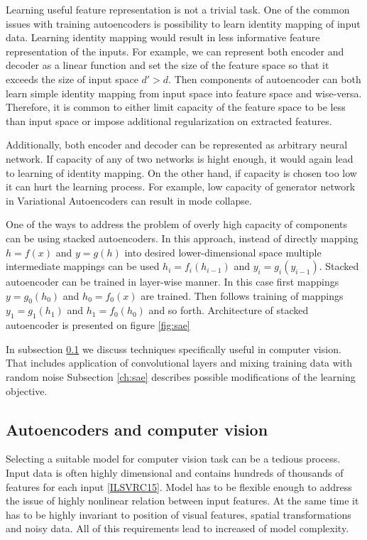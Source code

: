 Learning useful feature representation is not a trivial task.
One of the common issues with training autoencoders is possibility to learn identity mapping of input data.
Learning identity mapping would result in less informative feature representation of the inputs.
For example, we can represent both encoder and decoder as a linear function and set the size of the feature space so that it exceeds the size of input space $d' > d$.
Then components of autoencoder can both learn simple identity mapping from input space into feature space and wise-versa.
Therefore, it is common to either limit capacity of the feature space to be less than input space or impose additional regularization on extracted features.

Additionally, both encoder and decoder can be represented as arbitrary neural network.
If capacity of any of two networks is hight enough, it would again lead to learning of identity mapping.
On the other hand, if capacity is chosen too low it can hurt the learning process.
For example, low capacity of generator network in Variational Autoencoders can result in mode collapse.

One of the ways to address the problem of overly high capacity of components can be using stacked autoencoders.
In this approach, instead of directly mapping $h=f(x)$ and $y=g(h)$ into desired lower-dimensional space multiple intermediate mappings can be used $h_i=f_i(h_{i-1})$ and $y_i=g_i(y_{i-1})$.
Stacked autoencoder can be trained in layer-wise manner.
In this case first mappings $y=g_0(h_0)$ and $h_0=f_0(x)$ are trained.
Then follows training of mappings $y_1=g_1(h_1)$ and $h_1=f_0(h_0)$ and so forth.
Architecture of stacked autoencoder is presented on figure \ref{fig:sae}



In subsection \ref{ch:dcae} we discuss techniques specifically useful in computer vision.
That includes application of convolutional layers and mixing training data with random noise
Subsection \ref{ch:sae} describes possible modifications of the learning objective.


\subsection{Autoencoders and computer vision}\label{ch:dcae}

Selecting a suitable model for computer vision task can be a tedious process.
Input data is often highly dimensional and contains hundreds of thousands of features for each input \ref{ILSVRC15}.
Model has to be flexible enough to address the issue of highly nonlinear relation between input features.
At the same time it has to be highly invariant to position of visual features, spatial transformations and noisy data.
All of this requirements lead to increased of model complexity.

